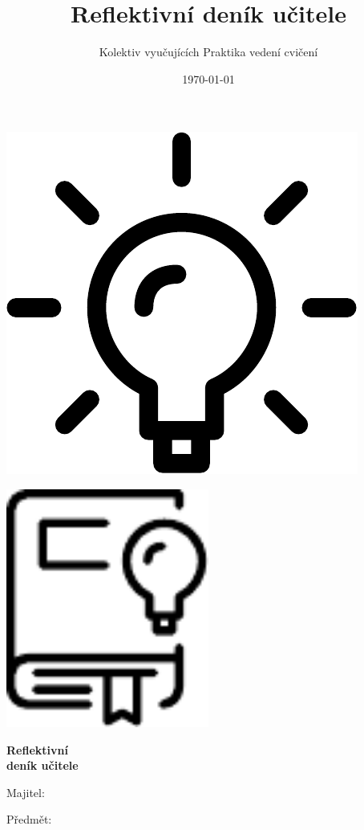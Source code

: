 \documentclass[twoside,openany]{book}
\title{Reflektivní deník učitele}
\author{Kolektiv vyučujících Praktika vedení cvičení}
\date{\today}
\begin{document}
\begin{titlepage}
	\vspace*{0.14\paperheight}
	\centering
	\includegraphics[width=0.7\paperwidth]{img/lightbulb}
	\newpage
\end{titlepage}
\begin{titlepage}
	\centering
	\vspace*{1cm}
	\includegraphics[width=0.5\textwidth]{img/diary}\par
	\vspace{0.5cm}
	{\huge\bfseries Reflektivní\\ deník učitele\par}
	\vfill
	\raggedright
	\Large
	Majitel:\par
	\vspace{0.2cm}
	Předmět:\par
\end{titlepage}
\end{document}
